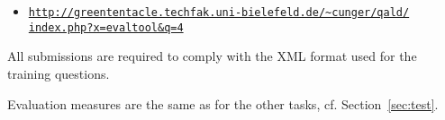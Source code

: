 \begin{itemize}
\item[] \href{http://greententacle.techfak.uni-bielefeld.de/~cunger/qald/index.php?x=evaltool&q=4}{\texttt{http://greententacle.techfak.uni-bielefeld.de/\textasciitilde cunger/qald/\\index.php?x=evaltool\&q=4}}
\end{itemize}

All submissions are required to comply with the XML format used for the training questions. 

Evaluation measures are the same as for the other tasks, cf. Section~\ref{sec:test}.
